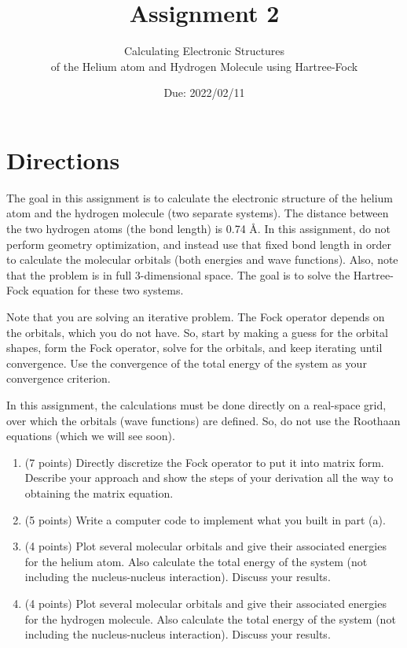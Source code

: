 \documentclass[10pt, oneside, letterpaper]{article}
\title{Assignment 2}
\author{Calculating Electronic Structures \\ of the Helium atom and Hydrogen Molecule using Hartree-Fock}
\date{Due: 2022/02/11}
\newcommand{\angstrom}{\textup{\AA}} %
\begin{document}
\maketitle
\thispagestyle{fancy}

\section{Directions}

The goal in this assignment is to calculate the electronic structure of the helium atom and the hydrogen molecule (two separate systems). The distance between the two hydrogen atoms (the bond length) is 0.74 \angstrom. In this assignment, do not perform geometry optimization, and instead use that fixed bond length in order to calculate the molecular orbitals (both energies and wave functions). Also, note that the problem is in full 3-dimensional space. The goal is to solve the Hartree-Fock equation for these two systems.

Note that you are solving an iterative problem. The Fock operator depends on the orbitals, which you do not have. So, start by making a guess for the orbital shapes, form the Fock operator, solve for the orbitals, and keep iterating until convergence. Use the convergence of the total energy of the system as your convergence criterion.

In this assignment, the calculations must be done directly on a real-space grid, over which the orbitals (wave functions) are defined. So, do not use the Roothaan equations (which we will see soon).

\begin{enumerate}[label=(\alph*)]
  \item (7 points) Directly discretize the Fock operator to put it into matrix form. Describe your approach and show the steps of your derivation all the way to obtaining the matrix equation.
  \item (5 points) Write a computer code to implement what you built in part (a).
  \item (4 points) Plot several molecular orbitals and give their associated energies for the helium atom. Also calculate the total energy of the system (not including the nucleus-nucleus interaction). Discuss your results.
  \item (4 points) Plot several molecular orbitals and give their associated energies for the hydrogen molecule. Also calculate the total energy of the system (not including the nucleus-nucleus interaction). Discuss your results.
\end{enumerate}
\end{document}
